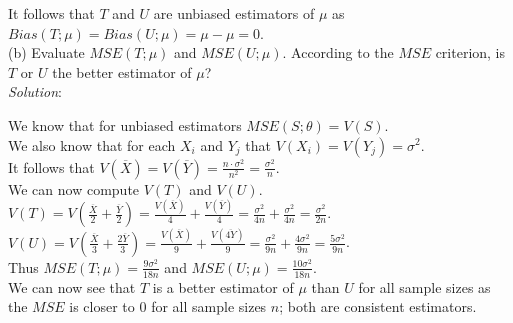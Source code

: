 \documentclass[12pt]{article}
\newcommand{\XB}{\color{black}}
\newcommand{\XV}{\color{violet}}
\begin{document}
\noindent
It follows that $ T $ and $ U $ are unbiased estimators of $ \mu $ as $ Bias(T;\mu) = Bias(U;\mu) = \mu - \mu = 0 $. \\



(b) Evaluate $ MSE(T; \mu) $ and $ MSE(U; \mu) $. According to the $ MSE $ criterion, is $ T $ or $ U $ the better estimator of $ \mu $?
\vspace{2.5mm} \\
\textit{Solution}:
\vspace{2.5mm}

\noindent
We know that for unbiased estimators $ MSE(S;\theta) = V(S) $. \\

\noindent
We also know that for each $ X_{i} $ and $ Y_{j} $ that $ V(X_{i}) = V(Y_{j}) = \sigma^{2} $. \\

\noindent
It follows that $ \displaystyle V(\overline{X}) = V(\overline{Y}) = \frac{n \cdot \sigma^{2}}{n^{2}} = \frac{\sigma^{2}}{n} $. \\

\noindent
We can now compute $ V(T) $ and $ V(U) $. \\

\noindent
$ \displaystyle V(T) = V(\frac{\overline{X}}{2} + \frac{\overline{Y}}{2}) = \frac{V(\overline{X})}{4} + \frac{V(\overline{Y})}{4} = \frac{\sigma^2}{4n} + \frac{\sigma^2}{4n} = \frac{\sigma^2}{2n} $. \\

\noindent
$ \displaystyle V(U) = V(\frac{\overline{X}}{3} + \frac{2\overline{Y}}{3}) = \frac{V(\overline{X})}{9} + \frac{V(\overline{4Y})}{9} = \frac{\sigma^2}{9n} + \frac{4\sigma^2}{9n} = \frac{5\sigma^2}{9n} $. \\

\noindent
Thus $ \displaystyle MSE(T; \mu) = \frac{9\sigma^2}{18n} $ and $ \displaystyle MSE(U; \mu) = \frac{10\sigma^{2}}{18n} $. \\

\noindent
We can now see that $ T $ is a better estimator of $ \mu $ than $ U $ for all sample sizes as the $ MSE $ is closer to $ 0 $ for all sample sizes $ n $; both are consistent estimators. \\
\end{document}
